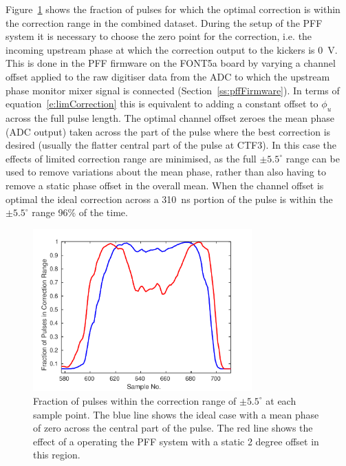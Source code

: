 Figure~\ref{f:longFF_fractInRange} shows the fraction of pulses for which the optimal correction is within the correction range in the combined dataset. During the setup of the PFF system it is necessary to choose the zero point for the correction, i.e. the incoming upstream phase at which the correction output to the kickers is 0~V. This is done in the PFF firmware on the FONT5a board by varying a channel offset applied to the raw digitiser data from the ADC to which the upstream phase monitor mixer signal is connected (Section~\ref{ss:pffFirmware}). In terms of equation~\ref{e:limCorrection} this is equivalent to adding a constant offset to \(\phi_u\) across the full pulse length. The optimal channel offset zeroes the mean phase (ADC output) taken across the part of the pulse where the best correction is desired (usually the flatter central part of the pulse at CTF3). In this case the effects of limited correction range are minimised, as the full \(\pm5.5^\circ\) range can be used to remove variations about the mean phase, rather than also having to remove a static phase offset in the overall mean. When the channel offset is optimal the ideal correction across a 310~ns portion of the pulse is within the \(\pm5.5^\circ\) range 96\% of the time.

\begin{figure}
  \centering
  \includegraphics[width=0.75\textwidth]{Figures/feedforward/longFF_fractInRange}
  \caption{Fraction of pulses within the correction range of \(\pm 5.5^\circ\) at each sample point. The blue line shows the ideal case with a mean phase of zero across the central part of the pulse. The red line shows the effect of a operating the PFF system with a static 2 degree offset in this region.}
  \label{f:longFF_fractInRange}
\end{figure}

